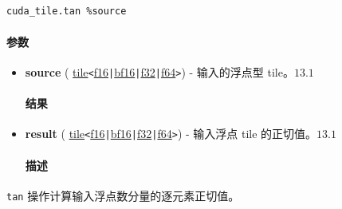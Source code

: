 \documentclass{article}
\begin{document}
\begin{lstlisting}

cuda_tile.tan %source

\end{lstlisting}



\paragraph{参数}


\begin{itemize}
\item \textbf{source} ( \href{https://docs.nvidia.com/cuda/tile-ir/latest/sections/types.html#type-tile}{tile}\texttt{<}\href{https://docs.nvidia.com/cuda/tile-ir/latest/sections/types.html#subsection-element-types}{f16}\texttt{|}\href{https://docs.nvidia.com/cuda/tile-ir/latest/sections/types.html#subsection-element-types}{bf16}\texttt{|}\href{https://docs.nvidia.com/cuda/tile-ir/latest/sections/types.html#subsection-element-types}{f32}\texttt{|}\href{https://docs.nvidia.com/cuda/tile-ir/latest/sections/types.html#subsection-element-types}{f64}\texttt{>}) - 输入的浮点型 tile。$\boxed{13.1}$




\paragraph{结果}


\item \textbf{result} ( \href{https://docs.nvidia.com/cuda/tile-ir/latest/sections/types.html#type-tile}{tile}\texttt{<}\href{https://docs.nvidia.com/cuda/tile-ir/latest/sections/types.html#subsection-element-types}{f16}\texttt{|}\href{https://docs.nvidia.com/cuda/tile-ir/latest/sections/types.html#subsection-element-types}{bf16}\texttt{|}\href{https://docs.nvidia.com/cuda/tile-ir/latest/sections/types.html#subsection-element-types}{f32}\texttt{|}\href{https://docs.nvidia.com/cuda/tile-ir/latest/sections/types.html#subsection-element-types}{f64}\texttt{>}) - 输入浮点 tile 的正切值。$\boxed{13.1}$




\paragraph{描述}


\end{itemize}
\texttt{tan} 操作计算输入浮点数分量的逐元素正切值。
\end{document}
